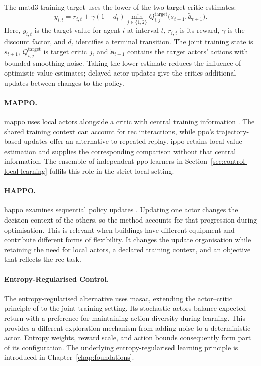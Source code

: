 \begin{samepage}
The \gls{matd3} training target uses the lower of the two target-critic estimates:
\begin{equation}
 y_{i,t}=r_{i,t}+\gamma(1-d_t)
 \min_{j\in\{1,2\}}Q^{\mathrm{target}}_{i,j}
 \bigl(s_{t+1},\widetilde{\mathbf a}_{t+1}\bigr).
 \label{eq:control-matd3-target}
\end{equation}
Here, $y_{i,t}$ is the target value for agent $i$ at interval $t$, $r_{i,t}$ is its reward, $\gamma$ is the discount factor, and $d_t$ identifies a terminal transition. The joint training state is $s_{t+1}$, $Q^{\mathrm{target}}_{i,j}$ is target critic $j$, and $\widetilde{\mathbf a}_{t+1}$ contains the target actors' actions with bounded smoothing noise. Taking the lower estimate reduces the influence of optimistic value estimates; delayed actor updates give the critics additional updates between changes to the policy.
\end{samepage}

\paragraph{MAPPO.}
\gls{mappo} uses local actors alongside a critic with central training information \parencite{yu2022mappo}. The shared training context can account for \gls{rec} interactions, while \gls{ppo}'s trajectory-based updates offer an alternative to repeated replay. \gls{ippo} retains local value estimation and supplies the corresponding comparison without that central information. The ensemble of independent \gls{ppo} learners in Section~\ref{sec:control-local-learning} fulfils this role in the strict local setting.

\paragraph{HAPPO.}
\gls{happo} examines sequential policy updates \parencite{kuba2022happo}. Updating one actor changes the decision context of the others, so the method accounts for that progression during optimisation. This is relevant when buildings have different equipment and contribute different forms of flexibility. It changes the update organisation while retaining the need for local actors, a declared training context, and an objective that reflects the \gls{rec} task.

\paragraph{Entropy-Regularised Control.}
The entropy-regularised alternative uses \gls{masac}, extending the actor--critic principle of \textcite{haarnoja2018sac} to the joint training setting. Its stochastic actors balance expected return with a preference for maintaining action diversity during learning. This provides a different exploration mechanism from adding noise to a deterministic actor. Entropy weights, reward scale, and action bounds consequently form part of its configuration. The underlying entropy-regularised learning principle is introduced in Chapter~\ref{chap:foundations}.

